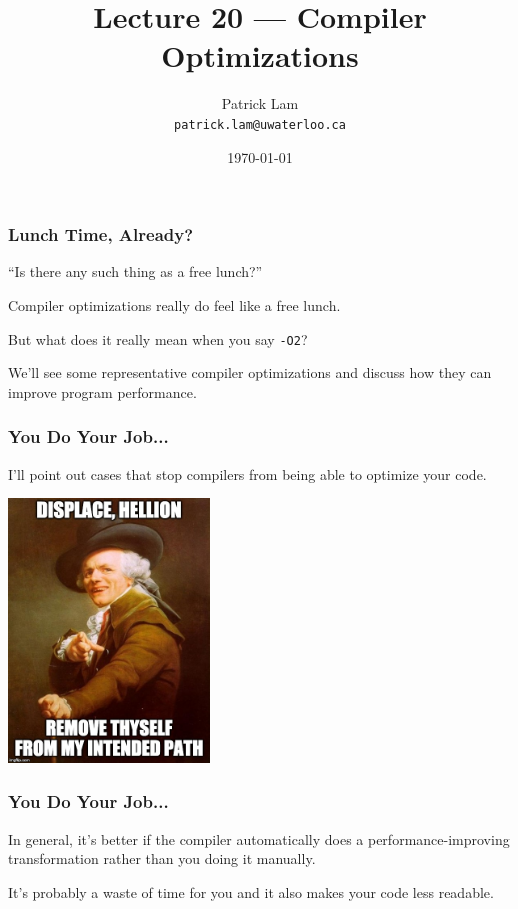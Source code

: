 

\title{Lecture 20 --- Compiler Optimizations }

\author{Patrick Lam \\ \small \texttt{patrick.lam@uwaterloo.ca}}
\date{\today}




\begin{frame}
  \titlepage

\end{frame}

\begin{frame}
\frametitle{Lunch Time, Already?}

``Is there any such thing as a free lunch?''

Compiler optimizations really do feel like a free lunch.


But what does it really mean when you say {\tt -O2}?


We'll see some representative compiler optimizations and discuss how
they can improve program performance. 

\end{frame}

\begin{frame}
\frametitle{You Do Your Job...}

I'll point out cases that stop compilers
from being able to optimize your code. 

\begin{center}
	\includegraphics[width=0.4\textwidth]{images/ducreux.jpg}
\end{center}

\end{frame}

\begin{frame}
\frametitle{You Do Your Job...}

In general, it's better if the
compiler automatically does a performance-improving transformation
rather than you doing it manually.

It's probably a waste of time for
you and it also makes your code less readable.

\end{frame}


